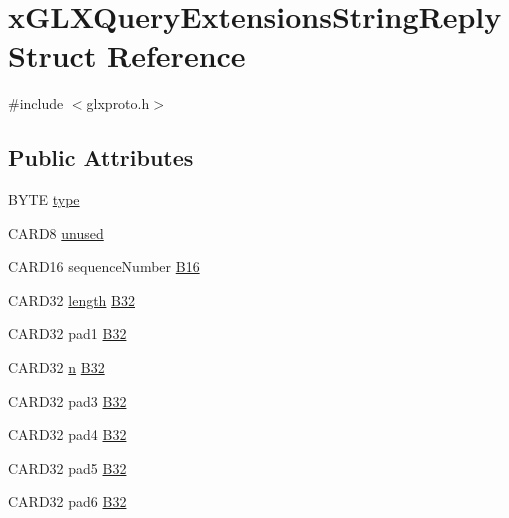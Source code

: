\hypertarget{structx_g_l_x_query_extensions_string_reply}{}\section{x\+G\+L\+X\+Query\+Extensions\+String\+Reply Struct Reference}
\label{structx_g_l_x_query_extensions_string_reply}


{\ttfamily \#include $<$glxproto.\+h$>$}

\subsection*{Public Attributes}
\begin{DoxyCompactItemize}
\item 
B\+Y\+TE \hyperlink{structx_g_l_x_query_extensions_string_reply_a8de96f2f3f3a2f95b4b77dafd71c2a01}{type}
\item 
C\+A\+R\+D8 \hyperlink{structx_g_l_x_query_extensions_string_reply_a258f16f72229551f58330d35e2d78e45}{unused}
\item 
C\+A\+R\+D16 sequence\+Number \hyperlink{structx_g_l_x_query_extensions_string_reply_a8fc646b7a29fa4288867570bd41fe2bb}{B16}
\item 
C\+A\+R\+D32 \hyperlink{glcorearb_8h_ab9c919755bde3b34349e23a32b4e0fa7}{length} \hyperlink{structx_g_l_x_query_extensions_string_reply_a3b7146081604e9447e170b730a12eeb2}{B32}
\item 
C\+A\+R\+D32 pad1 \hyperlink{structx_g_l_x_query_extensions_string_reply_a603a0c67743127a1a37604d97757cc46}{B32}
\item 
C\+A\+R\+D32 \hyperlink{glcorearb_8h_ae2b4646468bc89d0ba646f5cf838e051}{n} \hyperlink{structx_g_l_x_query_extensions_string_reply_afe332031391269b0d0979e893d9e5265}{B32}
\item 
C\+A\+R\+D32 pad3 \hyperlink{structx_g_l_x_query_extensions_string_reply_adf721f8f05c230654a046914996a0364}{B32}
\item 
C\+A\+R\+D32 pad4 \hyperlink{structx_g_l_x_query_extensions_string_reply_a7d569317c0078247e0a308419c1bf43d}{B32}
\item 
C\+A\+R\+D32 pad5 \hyperlink{structx_g_l_x_query_extensions_string_reply_ae43ae64d3399f12140f6d23dbea59b01}{B32}
\item 
C\+A\+R\+D32 pad6 \hyperlink{structx_g_l_x_query_extensions_string_reply_a5f13e9fcbfdf8fd80e8ba79b83cffeae}{B32}
\end{DoxyCompactItemize}


